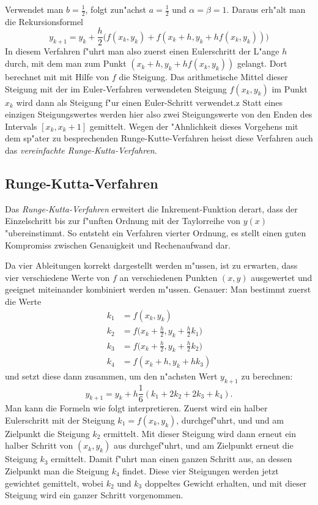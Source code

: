 Verwendet man $b=\frac12$, folgt zun"achst $a=\frac12$ und $\alpha=\beta=1$.
Daraus erh"alt man die Rekursionsformel
\begin{equation}
y_{k+1}=y_k+\frac{h}2\biggl(
f(x_k,y_k) + f(x_k+h, y_k + hf(x_k,y_k))
\biggr)
\label{numerik:simplified-runge-kutta}
\end{equation}
In diesem Verfahren f"uhrt man also zuerst einen Eulerschritt der L"ange
$h$ durch, mit dem man zum Punkt $(x_k+h, y_k+hf(x_k,y_k))$ gelangt.
Dort berechnet mit mit Hilfe von $f$ die Steigung.
Das arithmetische Mittel dieser Steigung mit der im Euler-Verfahren
verwendeten Steigung $f(x_k,y_k)$ im Punkt $x_k$ wird dann als
Steigung f"ur einen Euler-Schritt verwendet.z
Statt eines einzigen Steigungswertes werden hier also zwei Steigungswerte
von den Enden des Intervals $[x_k,x_k+1]$ gemittelt.
Wegen der "Ahnlichkeit dieses Vorgehens mit dem sp"ater zu besprechenden
Runge-Kutte-Verfahren heisst diese Verfahren auch das {\em
vereinfachte Runge-Kutta-Verfahren}.

\subsection{Runge-Kutta-Verfahren\label{subsection:numerik:runge-kutta}}
Das {\em Runge-Kutta-Verfahren} erweitert die Inkrement-Funktion derart,
dass der Einzelschritt bis zur f"unften Ordnung mit der Taylorreihe von
$y(x)$ "ubereinstimmt.
So entsteht ein Verfahren vierter Ordnung, es stellt einen guten Kompromiss
zwischen Genauigkeit und Rechenaufwand dar.

Da vier Ableitungen korrekt dargestellt werden m"ussen, ist zu erwarten,
dass vier verschiedene Werte von $f$ an verschiedenen Punkten $(x,y)$
ausgewertet und geeignet miteinander kombiniert werden m"ussen.
Genauer: Man bestimmt zuerst die Werte
\begin{align*}
k_1&=f(x_k,y_k)\\
k_2&=f\biggl(x_k+\frac{h}2,y_k+\frac{h}2k_1\biggr)\\
k_3&=f\biggl(x_k+\frac{h}2,y_k+\frac{h}2k_2\biggr)\\
k_4&=f(x_k+h, y_k+hk_3)
\end{align*}
und setzt diese dann zusammen, um den n"achsten Wert $y_{k+1}$
zu berechnen:
\begin{equation}
y_{k+1} = y_k + h\frac{1}6(k_1 + 2k_2 + 2k_3 + k_4).
\label{numerik:runge-kutta-rekursion}
\end{equation}
Man kann die Formeln wie folgt interpretieren.
Zuerst wird ein halber Eulerschritt mit der Steigung $k_1=f(x_k,y_k)$,
durchgef"uhrt, und und am Zielpunkt die Steigung $k_2$ ermittelt.
Mit dieser Steigung wird dann erneut ein halber Schritt von $(x_k,y_k)$
aus durchgef"uhrt, und am Zielpunkt erneut die Steigung $k_3$ ermittelt.
Damit f"uhrt man einen ganzen Schritt aus, an dessen Zielpunkt man die
Steigung $k_4$ findet.
Diese vier Steigungen werden jetzt gewichtet gemittelt, wobei
$k_2$ und $k_3$ doppeltes Gewicht erhalten, und mit dieser
Steigung wird ein ganzer Schritt vorgenommen.

